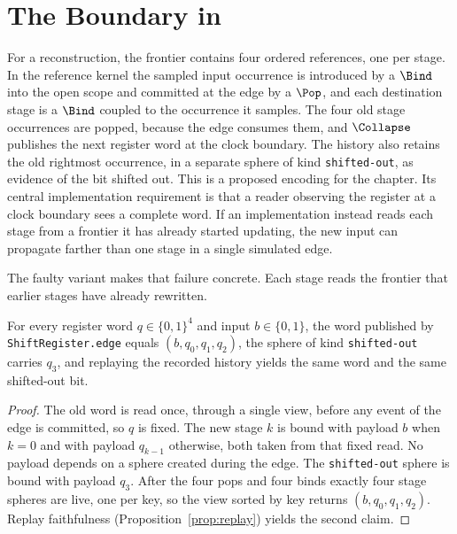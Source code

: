 \section{The Boundary in \SP{}}

For a \SP{} reconstruction, the frontier contains four ordered references, one per stage. In the reference kernel the sampled input occurrence is introduced by a $\Bind$ into the open scope and committed at the edge by a $\Pop$, and each destination stage is a $\Bind$ coupled to the occurrence it samples. The four old stage occurrences are popped, because the edge consumes them, and $\Collapse$ publishes the next register word at the clock boundary. The history also retains the old rightmost occurrence, in a separate sphere of kind \texttt{shifted-out}, as evidence of the bit shifted out. This is a proposed encoding for the chapter. Its central implementation requirement is that a reader observing the register at a clock boundary sees a complete word. If an implementation instead reads each stage from a frontier it has already started updating, the new input can propagate farther than one stage in a single simulated edge.


The faulty variant makes that failure concrete. Each stage reads the frontier that earlier stages have already rewritten.


\begin{proposition}\label{prop:clock}
For every register word $q\in\{0,1\}^4$ and input $b\in\{0,1\}$, the word published by \texttt{ShiftRegister.edge} equals $(b,q_0,q_1,q_2)$, the sphere of kind \texttt{shifted-out} carries $q_3$, and replaying the recorded history yields the same word and the same shifted-out bit.
\end{proposition}

\begin{proof}
The old word is read once, through a single view, before any event of the edge is committed, so $q$ is fixed. The new stage $k$ is bound with payload $b$ when $k=0$ and with payload $q_{k-1}$ otherwise, both taken from that fixed read. No payload depends on a sphere created during the edge. The \texttt{shifted-out} sphere is bound with payload $q_3$. After the four pops and four binds exactly four stage spheres are live, one per key, so the view sorted by key returns $(b,q_0,q_1,q_2)$. Replay faithfulness (Proposition~\ref{prop:replay}) yields the second claim.
\end{proof}

